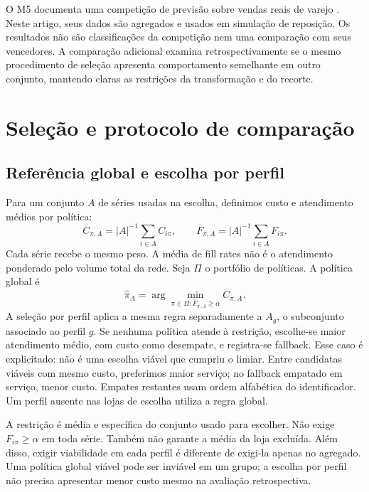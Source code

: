 \documentclass[preprint,12pt]{elsarticle}
\begin{document}
O M5 documenta uma competição de previsão sobre vendas reais de varejo \cite{Makridakis2022M5Accuracy}. Neste artigo, seus dados são agregados e usados em simulação de reposição. Os resultados não são classificações da competição nem uma comparação com seus vencedores. A comparação adicional examina retrospectivamente se o mesmo procedimento de seleção apresenta comportamento semelhante em outro conjunto, mantendo claras as restrições da transformação e do recorte.



\section{Seleção e protocolo de comparação}
\subsection{Referência global e escolha por perfil}
Para um conjunto $A$ de séries usadas na escolha, definimos custo e atendimento médios por política:
\begin{equation}
 \bar C_{\pi,A}=|A|^{-1}\sum_{i\in A}C_{i\pi},\qquad
 \bar F_{\pi,A}=|A|^{-1}\sum_{i\in A}F_{i\pi}.
\end{equation}
Cada série recebe o mesmo peso. A média de fill rates não é o atendimento ponderado pelo volume total da rede. Seja $\Pi$ o portfólio de políticas. A política global é
\begin{equation}
 \widehat\pi_A=\arg\min_{\pi\in\Pi:\bar F_{\pi,A}\geq\alpha}\bar C_{\pi,A}.
\end{equation}
A seleção por perfil aplica a mesma regra separadamente a $A_g$, o subconjunto associado ao perfil $g$. Se nenhuma política atende à restrição, escolhe-se maior atendimento médio, com custo como desempate, e registra-se fallback. Esse caso é explicitado: não é uma escolha viável que cumpriu o limiar. Entre candidatas viáveis com mesmo custo, preferimos maior serviço; no fallback empatado em serviço, menor custo. Empates restantes usam ordem alfabética do identificador. Um perfil ausente nas lojas de escolha utiliza a regra global.

A restrição é média e específica do conjunto usado para escolher. Não exige $F_{i\pi}\geq\alpha$ em toda série. Também não garante a média da loja excluída. Além disso, exigir viabilidade em cada perfil é diferente de exigi-la apenas no agregado. Uma política global viável pode ser inviável em um grupo; a escolha por perfil não precisa apresentar menor custo mesmo na avaliação retrospectiva.
\end{document}
